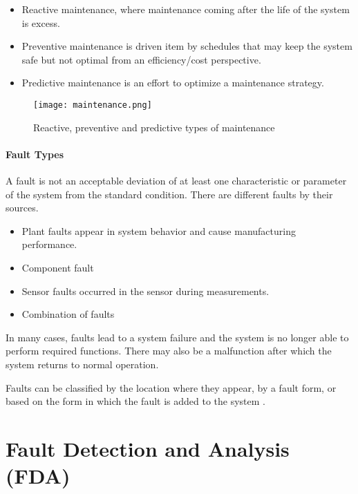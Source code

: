 \begin{itemize}
    \item Reactive maintenance, where maintenance coming after the life of
        the system is excess.
    \item Preventive maintenance is driven item by
        schedules that may keep the system safe but not optimal from an
        efficiency/cost perspective. 
    \item Predictive maintenance is an
        effort to optimize a maintenance strategy.
\end{itemize}

\begin{figure}[h!]
    \centering
    \texttt{[image: maintenance.png]}
    \caption{Reactive, preventive and predictive types of maintenance
    \cite{matlab_intro}}
    \label{fig:maintenance}
\end{figure}


\paragraph{Fault Types} A fault is not an acceptable deviation of at least one
characteristic or parameter of the system from the standard condition.
There are different faults by their sources. 
\begin{itemize}
    \item Plant faults appear in system
        behavior and cause manufacturing performance.
    \item Component fault
    \item Sensor faults occurred in the sensor during measurements.
    \item Combination of faults
\end{itemize}
In many cases, faults lead to a system failure and
the system is no longer able to perform required functions.
There may also be a malfunction after which the system returns to normal
operation. 

Faults can be classified by the location where they appear, by a fault
form, or based on the form in which the fault is added to the system
\cite{lit_survey}.


% 

\section{Fault Detection and Analysis (FDA)}\label{sec:fda}

